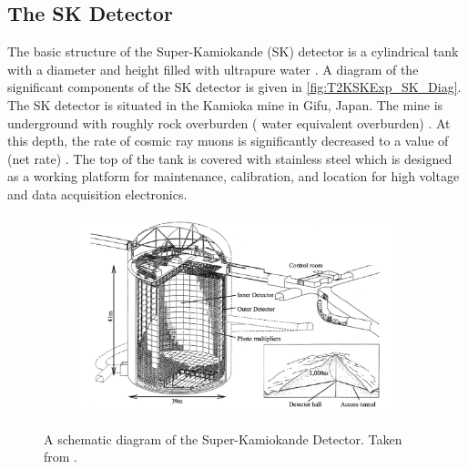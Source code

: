 \subsection{The SK Detector}
\label{subsec:T2KSKExp_SKDetector}

The basic structure of the Super-Kamiokande (SK) detector is a cylindrical tank with a diameter  and height  filled with ultrapure water \cite{Abe_2014_SKCalib}. A diagram of the significant components of the SK detector is given in \autoref{fig:T2KSKExp_SK_Diag}. The SK detector is situated in the Kamioka mine in Gifu, Japan. The mine is underground with roughly  rock overburden ( water equivalent overburden) \cite{Fukuda2003-ly}. At this depth, the rate of cosmic ray muons is significantly decreased to a value of  (net rate) \cite{t2k_sk}. The top of the tank is covered with stainless steel which is designed as a working platform for maintenance, calibration, and location for high voltage and data acquisition electronics.

\begin{figure}[h]
  \begin{subfigure}[t]{0.95\textwidth}
    \includegraphics[width=\textwidth, trim={0mm 0mm 0mm 0mm}, clip,page=1]{Figures/Detectors/SKDiagram.pdf}
  \end{subfigure}
  \caption{A schematic diagram of the Super-Kamiokande Detector. Taken from \cite{Itow2001-bc}.}
  \label{fig:T2KSKExp_SK_Diag}
\end{figure}

